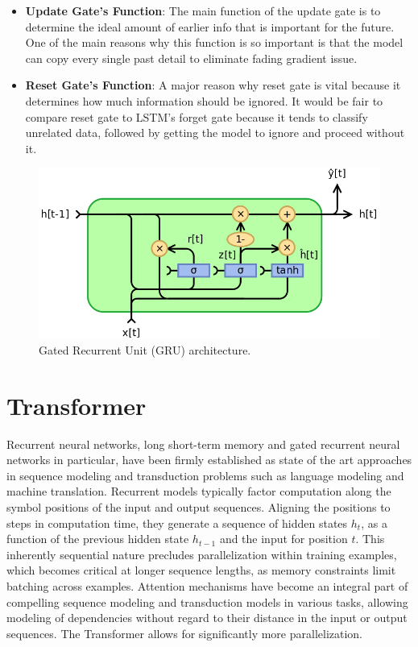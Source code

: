 \begin{itemize}
	\item \textbf{Update Gate’s Function}: The main function of the update gate is to determine the ideal amount of earlier info that is important for the future. One of the main reasons why this function is so important is that the model can copy every single past detail to eliminate fading gradient issue.
	\item \textbf{Reset Gate's Function}: A major reason why reset gate is vital because it determines how much information should be ignored. It would be fair to compare reset gate to LSTM’s forget gate because it tends to classify unrelated data, followed by getting the model to ignore and proceed without it.
\end{itemize}

\begin{figure}[H]
	\centering
	\includegraphics[width=.90\linewidth]{chapters/1_introduction/imgs/gru.png}
	\caption{Gated Recurrent Unit (GRU) architecture.}
	\label{fig:gruarch}
\end{figure}

\section{Transformer}

Recurrent neural networks, long short-term memory and gated recurrent neural networks
in particular, have been firmly established as state of the art approaches in sequence modeling and
transduction problems such as language modeling and machine translation.
Recurrent models typically factor computation along the symbol positions of the input and output
sequences. Aligning the positions to steps in computation time, they generate a sequence of hidden
states $h_t$, as a function of the previous hidden state $h_{t-1}$
and the input for position $t$. This inherently
sequential nature precludes parallelization within training examples, which becomes critical at longer
sequence lengths, as memory constraints limit batching across examples.
Attention mechanisms have become an integral part of compelling sequence modeling and transduction models in various tasks, allowing modeling of dependencies without regard to their distance in
the input or output sequences.
The Transformer allows for significantly more parallelization.

